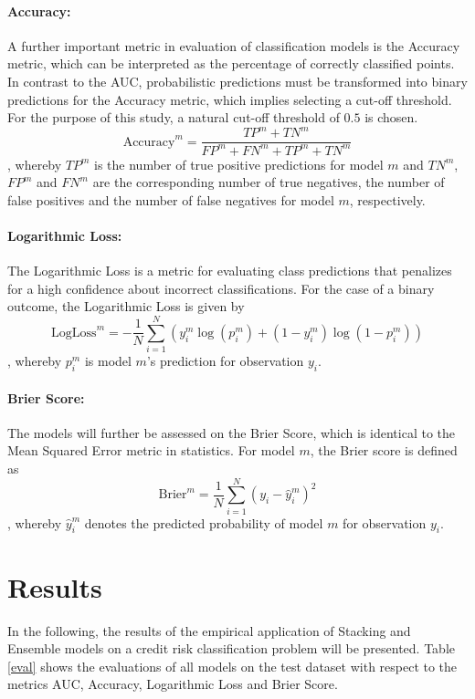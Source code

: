 \documentclass[12pt]{article}
\begin{document}
\paragraph{Accuracy:} A further important metric in evaluation of classification models is the Accuracy metric, which can be interpreted as the percentage of correctly classified points. In contrast to the AUC, probabilistic predictions must be transformed into binary predictions for the Accuracy metric, which implies selecting a cut-off threshold. For the purpose of this study, a natural cut-off threshold of $0.5$ is chosen.
\begin{equation}
\text{Accuracy}^m = \frac{TP^m + TN^m}{FP^m + FN^m + TP^m + TN^m}
\end{equation}
, whereby $TP^m$ is the number of true positive predictions for model $m$ and $TN^m$, $FP^m$ and $FN^m$ are the corresponding number of true negatives, the number of false positives and the number of false negatives for model $m$, respectively.

\paragraph{Logarithmic Loss:} The Logarithmic Loss is a metric for evaluating class predictions that penalizes for a high confidence about incorrect classifications. For the case of a binary outcome, the Logarithmic Loss is given by\\
\begin{equation}
\text{LogLoss}^m = - \frac{1}{N}\sum_{i=1}^{N}(y^m_i\log(p^m_i) + (1 - y^m_i)\log(1 - p^m_i))
\end{equation}
, whereby $p^m_i$ is model $m$'s prediction for observation $y_i$.

\paragraph{Brier Score:} The models will further be assessed on the Brier Score, which is identical to the Mean Squared Error metric in statistics. For model $m$, the Brier score is defined as 
\begin{equation}
\text{Brier}^m = \frac{1}{N}\sum_{i=1}^{N}(y_i - \hat{y}^m_i)^2
\end{equation}
, whereby $\hat{y}^m_i$ denotes the predicted probability of model $m$ for observation $y_i$. 


\section{Results}\label{results}
In the following, the results of the empirical application of Stacking and Ensemble models on a credit risk classification problem will be presented. Table \ref{eval} shows the evaluations of all models on the test dataset with respect to the metrics AUC, Accuracy, Logarithmic Loss and Brier Score. 
\end{document}
